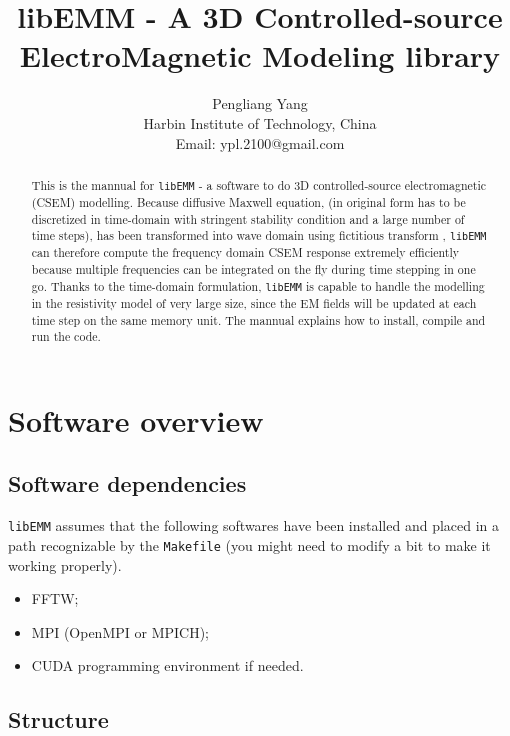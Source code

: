 \documentclass[10pt]{article}
\title{libEMM - A 3D Controlled-source ElectroMagnetic Modeling library}
\author{Pengliang Yang\\
  Harbin Institute of Technology, China\\
Email: ypl.2100@gmail.com}
\begin{document}
\maketitle


\begin{abstract}
  This is the mannual for \verb|libEMM| - a software to do 3D controlled-source electromagnetic (CSEM) modelling. Because diffusive Maxwell equation, (in original form has to be discretized in time-domain with stringent stability condition and a large number of time steps), has been transformed into wave domain using fictitious transform \citep{Mittet_2010_HFD}, \verb|libEMM| can therefore compute the frequency domain CSEM response extremely efficiently because multiple frequencies can be integrated on the fly during time stepping in one go. Thanks to the time-domain formulation, \verb|libEMM| is capable to handle the modelling in the resistivity model of very large size, since the EM fields will be updated at each time step on the same memory unit. The mannual explains how to install, compile and run the code.
\end{abstract}

\tableofcontents

\newpage

\section{Software overview}

\subsection{Software dependencies}

\verb|libEMM| assumes that the following softwares have been installed and placed in a path recognizable by the \texttt{Makefile} (you might need to modify a bit to make it working properly).
\begin{itemize}
\item FFTW;
\item MPI (OpenMPI or MPICH);
\item CUDA programming environment if needed.
\end{itemize}

\subsection{Structure}
\end{document}
